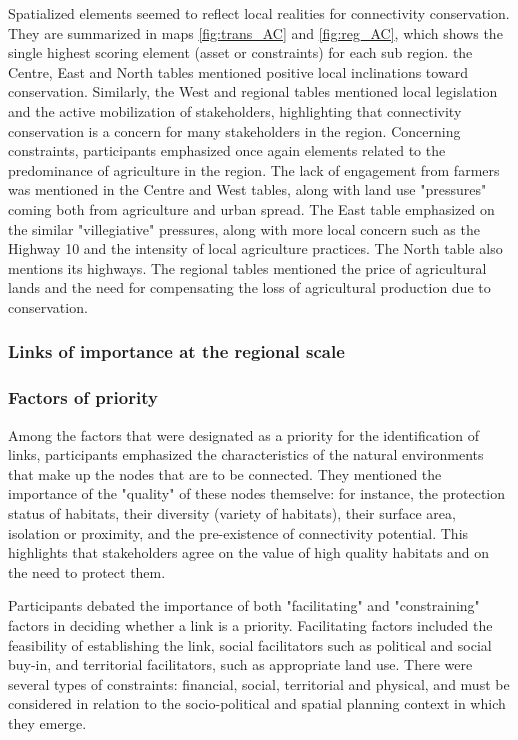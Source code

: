 Spatialized elements seemed to reflect local realities for connectivity conservation. They are summarized in maps \ref{fig:trans_AC} and \ref{fig:reg_AC}, which shows the single highest scoring element (asset or constraints) for each sub region. the Centre, East and North tables mentioned positive local inclinations toward conservation. Similarly, the West and regional tables mentioned local legislation and the active mobilization of stakeholders, highlighting that connectivity conservation is a concern for many stakeholders in the region. Concerning constraints, participants emphasized once again elements related to the predominance of agriculture in the region. The lack of engagement from farmers was mentioned in the Centre and West tables, along with land use "pressures" coming both from agriculture and urban spread. The East table emphasized on the similar "villegiative" pressures, along with more local concern such as the Highway 10 and the intensity of local agriculture practices. The North table also mentions its highways. The regional tables mentioned the price of agricultural lands and the need for compensating the loss of agricultural production due to conservation. \\

\subsubsection{Links of importance at the regional scale}

\subsubsection*{Factors of priority}

Among the factors that were designated as a priority for the identification of links, participants emphasized the characteristics of the natural environments that make up the nodes that are to be connected. They mentioned the importance of the "quality" of these nodes themselve: for instance, the protection status of habitats, their diversity (variety of habitats), their surface area, isolation or proximity, and the pre-existence of connectivity potential. This highlights that stakeholders agree on the value of high quality habitats and on the need to protect them.

Participants debated the importance of both "facilitating" and "constraining" factors in deciding whether a link is a priority. Facilitating factors included the feasibility of establishing the link, social facilitators such as political and social buy-in, and territorial facilitators, such as appropriate land use. There were several types of constraints: financial, social, territorial and physical, and must be considered in relation to the socio-political and spatial planning context in which they emerge. %


